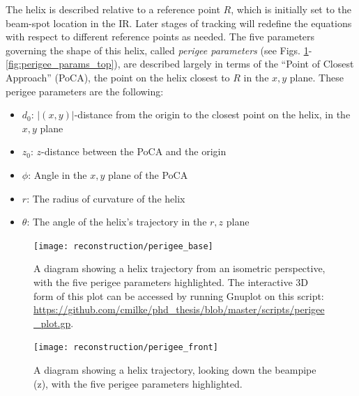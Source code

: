             The helix is described relative to a reference point $R$,
                which is initially set to the beam-spot location in the IR.
            Later stages of tracking will redefine the equations with respect to different reference points as needed.
            The five parameters governing the shape of this helix,
                called \textit{perigee parameters} (see Figs. \ref{fig:perigee_params_base}-\ref{fig:perigee_params_top}),
                are described largely in terms of the ``Point of Closest Approach'' (PoCA),
                the point on the helix closest to $R$ in the $x,y$ plane.
            These perigee parameters are the following:
            \begin{itemize}
                \item $d_0$: $|(x,y)|$-distance from the origin to the closest point on the helix, in the $x,y$ plane
                \item $z_0$: $z$-distance between the PoCA and the origin
                \item $\phi$: Angle in the $x,y$ plane of the PoCA
                \item $r$: The radius of curvature of the helix
                \item $\theta$: The angle of the helix's trajectory in the $r,z$ plane
            \end{itemize}

            \begin{figure}[tbh]
                \texttt{[image: reconstruction/perigee\_base]}
                \caption{
                    A diagram showing a helix trajectory from an isometric perspective,
                        with the five perigee parameters highlighted.
                    The interactive 3D form of this plot can be accessed by running Gnuplot\cite{gnuplot} on this script:
                        \url{https://github.com/cmilke/phd_thesis/blob/master/scripts/perigee_plot.gp}.
                }
                \label{fig:perigee_params_base}
            \end{figure}

            \begin{figure}[tbh]
                \texttt{[image: reconstruction/perigee\_front]}
                \caption{
                    A diagram showing a helix trajectory, looking down the beampipe (z),
                        with the five perigee parameters highlighted.
                }
                \label{fig:perigee_params_front}
            \end{figure}

